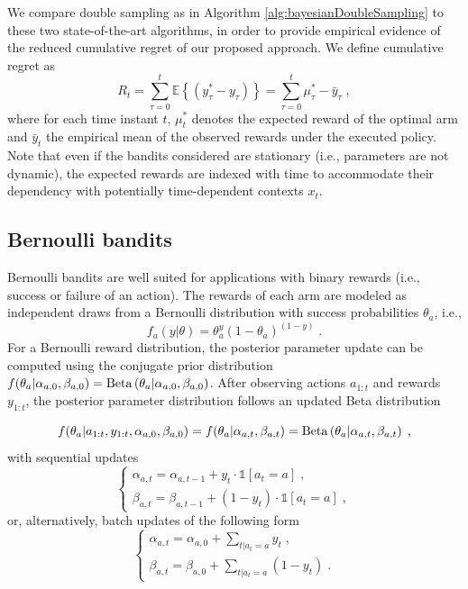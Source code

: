 \documentclass{article}
\newcommand{\eValue}[1]{\mathbb{E}\left\{ #1 \right\}}
\newcommand{\ie}{i.e., }
\newcommand{\Beta}[1]{{\rm Beta}\left( #1\right)}
\begin{document}
We compare double sampling as in Algorithm \ref{alg:bayesianDoubleSampling} to these two state-of-the-art algorithms, in order to provide empirical evidence of the reduced cumulative regret of our proposed approach. We define cumulative regret as
\begin{equation}
R_t=\sum_{\tau=0}^t \eValue{\left(y^*_{\tau}-y_{\tau} \right)} = \sum_{\tau=0}^t \mu_\tau^*-\bar{y}_{\tau} \; ,
\end{equation}
where for each time instant $t$, $\mu_t^*$ denotes the expected reward of the optimal arm and $\bar{y}_{t}$ the empirical mean of the observed rewards under the executed policy. Note that even if the bandits considered are stationary (\ie parameters are not dynamic), the expected rewards are indexed with time to accommodate their dependency with potentially time-dependent contexts $x_t$.

\subsection{Bernoulli bandits}
\label{ssec:bernoulli_bandits}

Bernoulli bandits are well suited for applications with binary rewards (\ie success or failure of an action). The rewards of each arm are modeled as independent draws from a Bernoulli distribution with success probabilities $\theta_a$, \ie
\begin{equation}
f_a(y|\theta)=\theta_a^{y}(1-\theta_a)^{(1-y)} \; .
\end{equation}
For a Bernoulli reward distribution, the posterior parameter update can be computed using the conjugate prior distribution $f(\theta_a|\alpha_{a,0}, \beta_{a,0})=\Beta{\theta_a|\alpha_{a,0}, \beta_{a,0}}$. After observing actions $a_{1:t}$ and rewards $y_{1:t}$, the posterior parameter distribution follows an updated Beta distribution

\begin{equation}
f(\theta_a|a_{1:t}, y_{1:t}, \alpha_{a,0}, \beta_{a,0}) =f(\theta_a|\alpha_{a,t}, \beta_{a,t}) =\Beta{\theta_a|\alpha_{a,t}, \beta_{a,t}}  \; ,
\end{equation}
with sequential updates
\begin{equation}
\begin{cases}
\alpha_{a,t}=\alpha_{a,t-1} + y_{t} \cdot \mathds{1}[a_t=a] \; ,\\
\beta_{a,t}=\beta_{a,t-1} + (1 - y_{t}) \cdot \mathds{1}[a_t=a] \; ,
\end{cases} 
\end{equation}
or, alternatively, batch updates of the following form
\begin{equation}
\begin{cases}
\alpha_{a,t}=\alpha_{a,0} + \sum_{t|a_t=a} y_{t} \; ,\\
\beta_{a,t}=\beta_{a,0} + \sum_{t|a_t=a} (1-y_{t}) \; .
\end{cases}
\end{equation}
\end{document}

